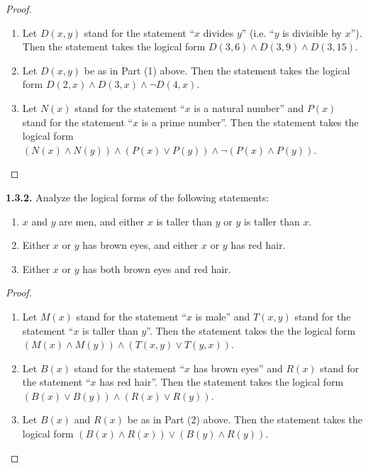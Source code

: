\documentclass[12pt]{amsart}
\newenvironment{statement}[1]{\smallskip\noindent\color[rgb]{.6627, .3529, .6314} {\bf #1.}}{}
\theoremstyle{definition}
\theoremstyle{remark}
\begin{document}
\begin{proof}
\hfill
\begin{enumerate}
	\item Let $D(x, y)$ stand for the statement ``$x$ divides $y$'' (i.e. ``$y$ is divisible by $x$'').
	Then the statement takes the logical form $D(3, 6) \wedge D(3, 9) \wedge D(3, 15)$.
	
	\item Let $D(x, y)$ be as in Part (1) above.
	Then the statement takes the logical form $D(2, x) \wedge D(3, x) \wedge \neg D(4, x)$.
	
	\item Let $N(x)$ stand for the statement ``$x$ is a natural number'' and $P(x)$ stand for the statement ``$x$ is a prime number''.
	Then the statement takes the logical form $(N(x) \wedge N(y)) \wedge (P(x) \vee P(y)) \wedge \neg (P(x) \wedge P(y))$.
\end{enumerate}
\end{proof}


\begin{statement}{1.3.2}
Analyze the logical forms of the following statements:
\begin{enumerate}
	\item $x$ and $y$ are men, and either $x$ is taller than $y$ or $y$ is taller than $x$.
	\item Either $x$ or $y$ has brown eyes, and either $x$ or $y$ has red hair.
	\item Either $x$ or $y$ has both brown eyes and red hair.
\end{enumerate}
\end{statement}

\begin{proof}
\hfill
\begin{enumerate}
	\item Let $M(x)$ stand for the statement ``$x$ is male'' and $T(x, y)$ stand for the statement ``$x$ is taller than $y$''.
	Then the statement takes the the logical form $(M(x) \wedge M(y)) \wedge (T(x, y) \vee T(y, x))$.
	
	\item Let $B(x)$ stand for the statement ``$x$ has brown eyes'' and $R(x)$ stand for the statement ``$x$ has red hair''.
	Then the statement takes the logical form $(B(x) \vee B(y)) \wedge (R(x) \vee R(y))$.
	
	\item Let $B(x)$ and $R(x)$ be as in Part (2) above.
	Then the statement takes the logical form $(B(x) \wedge R(x)) \vee (B(y) \wedge R(y))$.
\end{enumerate}
\end{proof}
\end{document}
